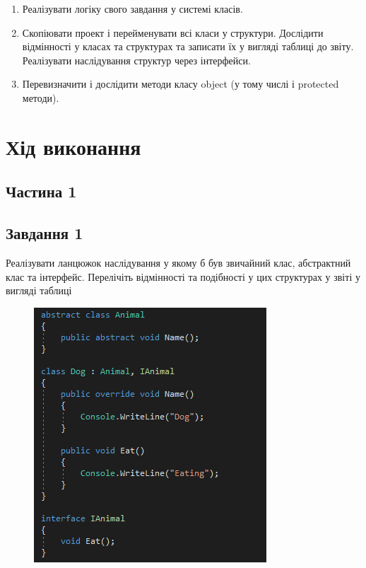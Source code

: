 \documentclass[oneside,14pt]{extarticle}
\begin{document}
\begin{normalsize}
\begin{enumerate}
		\item Реалізувати логіку свого завдання у системі класів.
		
		\item Скопіювати проект і перейменувати всі класи у структури. Дослідити відмінності у класах та структурах та записати їх у вигляді таблиці до звіту. Реалізувати наслідування структур через інтерфейси.
		
		\item Перевизначити і дослідити методи класу object (у тому числі і protected методи).
	\end{enumerate}

	\section*{Хід виконання}
	\subsection*{Частина 1}
	\subsection*{Завдання 1}
	Реалізувати ланцюжок наслідування у якому б був звичайний клас, абстрактний
	клас та інтерфейс. Перелічіть відмінності та подібності у цих структурах у звіті у
	вигляді таблиці
	\begin{figure}[H]
		\centering
		\includegraphics[scale=0.7]{11}
	\end{figure}
		

\end{normalsize}
\end{document}
